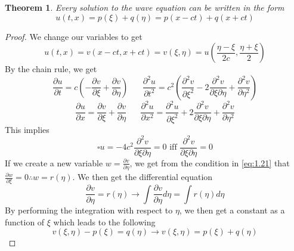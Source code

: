 \documentclass{article}
\newcommand{\pd}[2]{\frac{\partial #1}{\partial #2}}
\newcommand{\pdt}[2]{\frac{\partial ^2 #1}{\partial #2 ^2}}
\newtheorem{theorem}{Theorem}[section]
\numberwithin{equation}{section}
\begin{document}
\begin{theorem}
    Every solution to the wave equation can be written in the form 
    \begin{equation*}
        u(t,x) = p(\xi)+q(\eta) = p(x-ct)+q(x+ct) \label{theorem:1.2}
    \end{equation*}
\end{theorem}
\begin{proof}
    We change our variables to get 
    \begin{equation*}
        u(t,x) = v(x-ct,x+ct)=v(\xi,\eta)=u\left(\frac{\eta - \xi}{2c}, \frac{\eta+\xi}{2}\right)
    \end{equation*}
    By the chain rule, we get
    \begin{equation}
        \pd{u}{t}=c\left(-\pd{v}{\xi}+\pd{v}{\eta}\right) \hspace{20pt} \pdt{u}{t} = c^2\left(\pdt{v}{\xi} - 2\frac{\partial^2v}{\partial \xi \partial\eta}+\pdt{v}{\eta}\right) \label{eq:1.19}
    \end{equation} %
    \begin{equation}
        \pd{u}{x} = \pd{v}{\xi}+\pd{v}{\eta} \hspace{20pt} \pdt{u}{x} = \pdt{u}{\xi}+2\frac{\partial^2v}{\partial\xi\partial\eta} + \pdt{v}{\eta} \label{eq:1.20}
    \end{equation} %
    This implies 
    \begin{equation}
        \square u=-4c^2\frac{\partial^2v}{\partial\xi\partial\eta}=0 \text{ iff } \frac{\partial^2v}{\partial\xi \partial\eta} = 0 \label{eq:1.21}
    \end{equation} %
    If we create a new variable $w=\pd{v}{\eta}$, we get from the condition in \eqref{eq:1.21} that $\pd{w}{\xi}=0 \therefore w=r(\eta)$. We then get the differential equation 
    \begin{equation*}
        \pd{v}{\eta} = r(\eta) \rightarrow\int\pd{v}{\eta}d\eta = \int r(\eta)d\eta
    \end{equation*}
    By performing the integration with respect to $\eta$, we then get a constant as a function of $\xi$ which leads to the following
    \begin{equation*}
        v(\xi,\eta) - p(\xi)=q(\eta) \rightarrow v(\xi,\eta)=p(\xi)+q(\eta)
    \end{equation*}
\end{proof}
\end{document}
